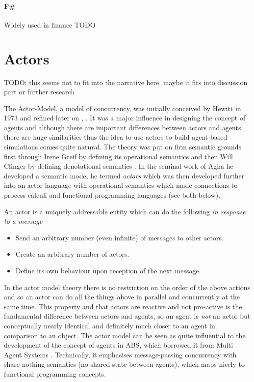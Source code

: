 \paragraph{F\#} Widely used in finance TODO 

\section{Actors}
\label{sec:actors}
TODO: this seems not to fit into the narrative here, maybe it fits into discussion part or further research

The Actor-Model, a model of concurrency, was initially conceived by Hewitt in 1973 \cite{hewitt_universal_1973} and refined later on \cite{hewitt_what_2007}, \cite{hewitt_actor_2010}. It was a major influence in designing the concept of agents and although there are important differences between actors and agents there are huge similarities thus the idea to use actors to build agent-based simulations comes quite natural. The theory was put on firm semantic grounds first through Irene Greif by defining its operational semantics \cite{grief_semantics_1975} and then Will Clinger by defining denotational semantics \cite{clinger_foundations_1981}. In the seminal work of Agha \cite{agha_actors:_1986} he developed a semantic mode, he termed \textit{actors} which was then developed further \cite{agha_foundation_1997} into an actor language with operational semantics which made connections to process calculi and functional programming languages (see both below). 

An actor is a uniquely addressable entity which can do the following \textit{in response to a message}
\begin{itemize}
	\item Send an arbitrary number (even infinite) of messages to other actors.
	\item Create an arbitrary number of actors.
	\item Define its own behaviour upon reception of the next message.
\end{itemize}

In the actor model theory there is no restriction on the order of the above actions and so an actor can do all the things above in parallel and concurrently at the same time. This property and that actors are reactive and not pro-active is the fundamental difference between actors and agents, so an agent is \textit{not} an actor but conceptually nearly identical and definitely much closer to an agent in comparison to an object. The actor model can be seen as quite influential to the development of the concept of agents in ABS, which borrowed it from Multi Agent Systems \cite{wooldridge_introduction_2009}. Technically, it emphasises message-passing concurrency with share-nothing semantics (no shared state between agents), which maps nicely to functional programming concepts.

